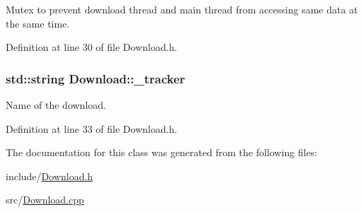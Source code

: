 Mutex to prevent download thread and main thread from accessing same data at the same time. 



Definition at line 30 of file Download.h.

\hypertarget{classDownload_a22071fe4126b403c73bf2290348a4bb1}{
\subsubsection[{\_\-tracker}]{\setlength{\rightskip}{0pt plus 5cm}std::string {\bf Download::\_\-tracker}}}
\label{classDownload_a22071fe4126b403c73bf2290348a4bb1}


Name of the download. 



Definition at line 33 of file Download.h.



The documentation for this class was generated from the following files:\begin{DoxyCompactItemize}
\item 
include/\hyperlink{Download_8h}{Download.h}\item 
src/\hyperlink{Download_8cpp}{Download.cpp}\end{DoxyCompactItemize}
